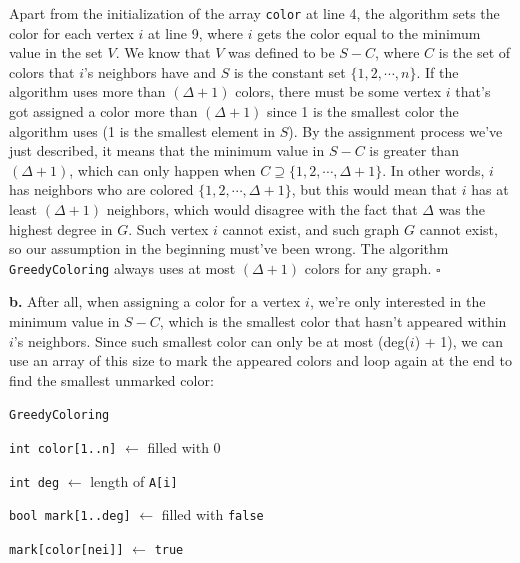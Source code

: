 \documentclass{article}
\begin{document}
\begin{enumerate}
    Apart from the initialization of the array \texttt{color} at line 4, the algorithm sets the color for each vertex $i$ at line 9, where $i$ gets the color equal to the minimum value in the set $V$. We know that $V$ was defined to be $S - C$, where $C$ is the set of colors that $i$'s neighbors have and $S$ is the constant set $\{1, 2, \cdots, n\}$. If the algorithm uses more than $(\Delta + 1)$ colors, there must be some vertex $i$ that's got assigned a color more than $(\Delta + 1)$ since 1 is the smallest color the algorithm uses (1 is the smallest element in $S$). By the assignment process we've just described, it means that the minimum value in $S - C$ is greater than $(\Delta + 1)$, which can only happen when $C \supseteq \{1, 2, \cdots, \Delta + 1\}$. In other words, $i$ has neighbors who are colored $\{1, 2, \cdots, \Delta + 1\}$, but this would mean that $i$ has at least $(\Delta + 1)$ neighbors, which would disagree with the fact that $\Delta$ was the highest degree in $G$. Such vertex $i$ cannot exist, and such graph $G$ cannot exist, so our assumption in the beginning must've been wrong. The algorithm \texttt{GreedyColoring} always uses at most $(\Delta + 1)$ colors for any graph. $\square$

    \textbf{b.} After all, when assigning a color for a vertex $i$, we're only interested in the minimum value in $S - C$, which is the smallest color that hasn't appeared within $i$'s neighbors. Since such smallest color can only be at most (deg($i$) + 1), we can use an array of this size to mark the appeared colors and loop again at the end to find the smallest unmarked color:
    \begin{center}
      \begin{minipage}{0.5625\linewidth}
        \renewcommand{\thealgocf}{}
        \begin{algorithm}[H]
          \caption{\texttt{GreedyColoring}}

          {\tt int color[1..n]} $\gets$ filled with 0

          \setcounter{AlgoLine}{5}

          {
            {\tt int deg} $\gets$ length of {\tt A[i]}

              {\tt bool mark[1..deg]} $\gets$ filled with {\tt false}

            {
              {
                {\tt mark[color[nei]]} $\gets$ {\tt true}
              }
            }

}
\end{algorithm}
\end{minipage}
\end{center}
\end{enumerate}
\end{document}
